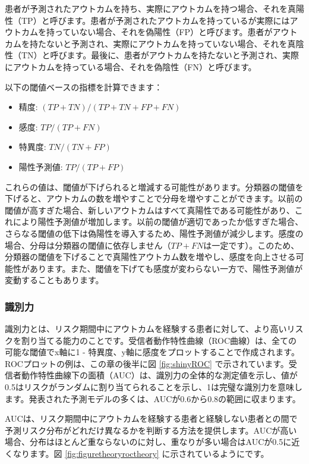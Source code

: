 \documentclass[
  11pt]{book}
\providecommand{\tightlist}{%
  \setlength{\itemsep}{0pt}\setlength{\parskip}{0pt}}
\theoremstyle{definition}
\theoremstyle{definition}
\theoremstyle{definition}
\theoremstyle{definition}
\theoremstyle{remark}
\begin{document}
患者が予測されたアウトカムを持ち、実際にアウトカムを持つ場合、それを真陽性（TP）と呼びます。患者が予測されたアウトカムを持っているが実際にはアウトカムを持っていない場合、それを偽陽性（FP）と呼びます。患者がアウトカムを持たないと予測され、実際にアウトカムを持っていない場合、それを真陰性（TN）と呼びます。最後に、患者がアウトカムを持たないと予測され、実際にアウトカムを持っている場合、それを偽陰性（FN）と呼びます。    

以下の閾値ベースの指標を計算できます：

\begin{itemize}
\tightlist
\item
  精度: \((TP+TN)/(TP+TN+FP+FN)\)
\item
  感度: \(TP/(TP+FN)\)
\item
  特異度: \(TN/(TN+FP)\)
\item
  陽性予測値: \(TP/(TP+FP)\)
\end{itemize}

これらの値は、閾値が下げられると増減する可能性があります。分類器の閾値を下げると、アウトカムの数を増やすことで分母を増やすことができます。以前の閾値が高すぎた場合、新しいアウトカムはすべて真陽性である可能性があり、これにより陽性予測値が増加します。以前の閾値が適切であったか低すぎた場合、さらなる閾値の低下は偽陽性を導入するため、陽性予測値が減少します。感度の場合、分母は分類器の閾値に依存しません（\(TP+FN\)は一定です）。このため、分類器の閾値を下げることで真陽性アウトカム数を増やし、感度を向上させる可能性があります。また、閾値を下げても感度が変わらない一方で、陽性予測値が変動することもあります。

\subsubsection*{識別力}\label{ux8b58ux5225ux529b}

識別力とは、リスク期間中にアウトカムを経験する患者に対して、より高いリスクを割り当てる能力のことです。受信者動作特性曲線（ROC曲線）は、全ての可能な閾値でx軸に1 - 特異度、y軸に感度をプロットすることで作成されます。ROCプロットの例は、この章の後半に図 \ref{fig:shinyROC} で示されています。受信者動作特性曲線下の面積（AUC）は、識別力の全体的な測定値を示し、値が0.5はリスクがランダムに割り当てられることを示し、1は完璧な識別力を意味します。発表された予測モデルの多くは、AUCが0.6から0.8の範囲に収まります。   

AUCは、リスク期間中にアウトカムを経験する患者と経験しない患者との間で予測リスク分布がどれだけ異なるかを判断する方法を提供します。AUCが高い場合、分布はほとんど重ならないのに対し、重なりが多い場合はAUCが0.5に近くなります。図 \ref{fig:figuretheoryroctheory} に示されているようにです。
\end{document}

